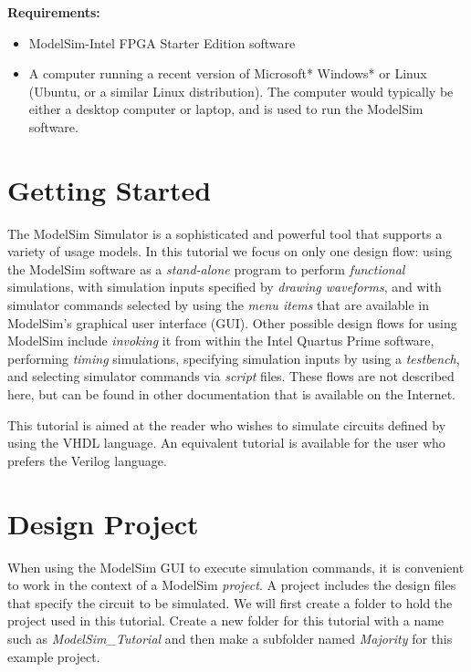 \documentclass[11pt, twoside, pdftex]{article}
\begin{document}
{\bf Requirements:}
\begin{itemize}
\item ModelSim-Intel FPGA Starter Edition software
\item A computer running a recent version of Microsoft* Windows* or Linux 
(Ubuntu, or a similar Linux distribution). The computer would typically be either a
desktop computer or laptop, and is used to run the ModelSim software.
\end{itemize}

\clearpage
\newpage
\section{Getting Started}

The ModelSim Simulator is a sophisticated and powerful tool that supports a variety of 
usage models. In this tutorial we focus on only one design flow: using the ModelSim
software as a {\it stand-alone} program to perform {\it functional} simulations, with 
simulation inputs specified by {\it drawing waveforms}, and with simulator commands selected 
by using the {\it menu items} that are available in ModelSim's graphical user interface
(GUI).  Other possible design flows for using ModelSim include {\it invoking} it from within the 
Intel Quartus Prime software, performing {\it timing} simulations, specifying simulation 
inputs by using a {\it testbench}, and selecting simulator commands via {\it script} files.
These flows are not described here, but can be found in other
documentation that is available on the Internet.  

This tutorial is aimed at the reader who wishes to simulate circuits defined
by using the VHDL language. An equivalent tutorial is
available for the user who prefers the Verilog language.
 
\section{Design Project}
When using the ModelSim GUI to execute simulation commands, it is convenient to work in the
context of a ModelSim {\it project}. A project includes the design files that specify the 
circuit to be simulated. We will first create a folder to hold the project used 
in this tutorial.  Create a new folder for this tutorial with a name such as
{\it ModelSim\_Tutorial} and then make a subfolder named {\it Majority} for this 
example project.
\end{document}
